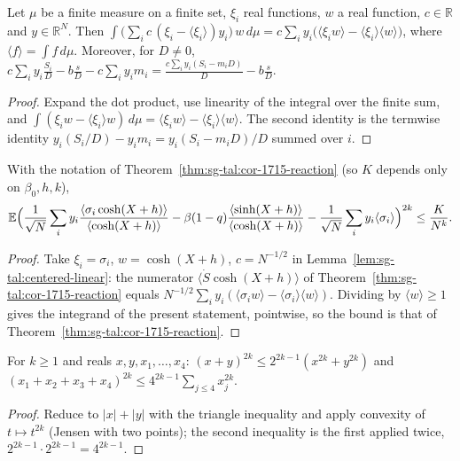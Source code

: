 \begin{lemma}
\label{lem:sg-tal:centered-linear}
  \leanok
Let $\mu$ be a finite measure on a finite set, $\xi_i$ real functions, $w$ a real function, $c\in\mathbb R$ and $y\in\mathbb R^N$. Then
$\int\bigl(\sum_ic\,(\xi_i-\langle\xi_i\rangle)y_i\bigr)\,w\,d\mu=c\sum_iy_i\bigl(\langle\xi_iw\rangle-\langle\xi_i\rangle\langle w\rangle\bigr)$, where $\langle f\rangle=\int f\,d\mu$.  Moreover, for $D\neq0$, $c\sum_iy_i\frac{S_i}{D}-b\frac{s}{D}-c\sum_iy_im_i=\frac{c\sum_iy_i(S_i-m_iD)}{D}-b\frac sD$.
\end{lemma}
\begin{proof}
  \leanok
Expand the dot product, use linearity of the integral over the finite sum, and $\int(\xi_iw-\langle\xi_i\rangle w)\,d\mu=\langle\xi_iw\rangle-\langle\xi_i\rangle\langle w\rangle$.  The second identity is the termwise identity $y_i(S_i/D)-y_im_i=y_i(S_i-m_iD)/D$ summed over $i$.
\end{proof}

\begin{theorem}
\label{thm:sg-tal:cor-1715-reaction-book}
  \leanok
{}
With the notation of Theorem~\ref{thm:sg-tal:cor-1715-reaction} (so $K$ depends only on $\beta_0,h,k$),
\[
\mathbb E\Bigl(\frac1{\sqrt N}\sum_iy_i\frac{\langle\sigma_i\cosh(X+h)\rangle}{\langle\cosh(X+h)\rangle}-\beta(1-q)\frac{\langle\sinh(X+h)\rangle}{\langle\cosh(X+h)\rangle}-\frac1{\sqrt N}\sum_iy_i\langle\sigma_i\rangle\Bigr)^{2k}\le\frac K{N^k}.
\]
\end{theorem}
\begin{proof}
  \leanok
Take $\xi_i=\sigma_i$, $w=\cosh(X+h)$, $c=N^{-1/2}$ in Lemma~\ref{lem:sg-tal:centered-linear}: the numerator $\langle\dot S\cosh(X+h)\rangle$ of Theorem~\ref{thm:sg-tal:cor-1715-reaction} equals $N^{-1/2}\sum_iy_i(\langle\sigma_iw\rangle-\langle\sigma_i\rangle\langle w\rangle)$.  Dividing by $\langle w\rangle\ge1$ gives the integrand of the present statement, pointwise, so the bound is that of Theorem~\ref{thm:sg-tal:cor-1715-reaction}.
\end{proof}

\begin{lemma}
\label{lem:sg-tal:convex-power}
  \leanok
{}
For $k\ge1$ and reals $x,y,x_1,\dots,x_4$:
$(x+y)^{2k}\le2^{2k-1}(x^{2k}+y^{2k})$ and $(x_1+x_2+x_3+x_4)^{2k}\le4^{2k-1}\sum_{j\le4}x_j^{2k}$.
\end{lemma}
\begin{proof}
  \leanok
Reduce to $|x|+|y|$ with the triangle inequality and apply convexity of $t\mapsto t^{2k}$ (Jensen with two points); the second inequality is the first applied twice, $2^{2k-1}\cdot2^{2k-1}=4^{2k-1}$.
\end{proof}

